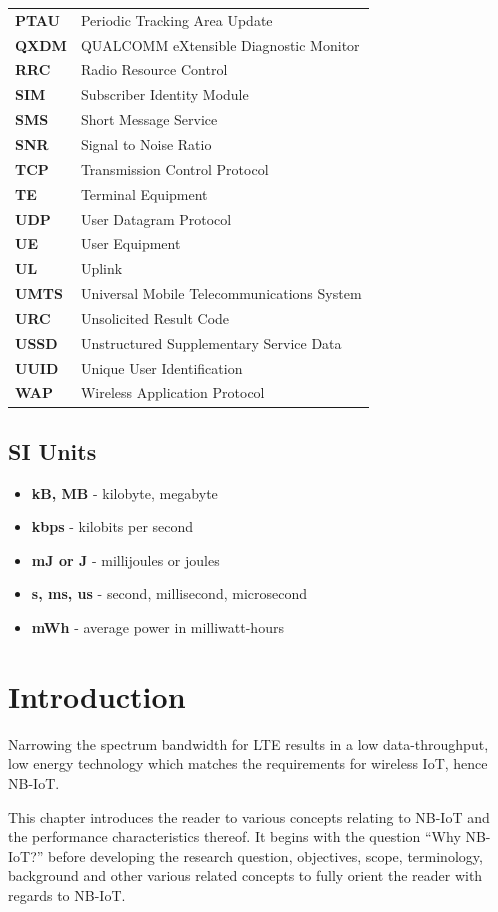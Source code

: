 \documentclass[]{article}
\makeatletter
\providecommand{\tightlist}{%
  \setlength{\itemsep}{0pt}\setlength{\parskip}{0pt}}
\newcounter{tableno}
\newenvironment{tablenos:no-prefix-table-caption}{
    \caption@ifcompatibility{}{
    \let\oldthetable\thetable
    \let\oldtheHtable\theHtable
    \renewcommand{\thetable}{tableno:\thetableno}
    \renewcommand{\theHtable}{tableno:\thetableno}
    \stepcounter{tableno}
    \captionsetup{labelformat=empty}
    }
}{
    \caption@ifcompatibility{}{
    \captionsetup{labelformat=default}
    \let\thetable\oldthetable
    \let\theHtable\oldtheHtable
    \addtocounter{table}{-1}
    }
}
\makeatother
\begin{document}
\begin{tablenos:no-prefix-table-caption}
\begin{longtable}[]{@{}ll@{}}
\textbf{PTAU} & Periodic Tracking Area Update\tabularnewline
\textbf{QXDM} & QUALCOMM eXtensible Diagnostic Monitor\tabularnewline
\textbf{RRC} & Radio Resource Control\tabularnewline
\textbf{SIM} & Subscriber Identity Module\tabularnewline
\textbf{SMS} & Short Message Service\tabularnewline
\textbf{SNR} & Signal to Noise Ratio\tabularnewline
\textbf{TCP} & Transmission Control Protocol\tabularnewline
\textbf{TE} & Terminal Equipment\tabularnewline
\textbf{UDP} & User Datagram Protocol\tabularnewline
\textbf{UE} & User Equipment\tabularnewline
\textbf{UL} & Uplink\tabularnewline
\textbf{UMTS} & Universal Mobile Telecommunications
System\tabularnewline
\textbf{URC} & Unsolicited Result Code\tabularnewline
\textbf{USSD} & Unstructured Supplementary Service Data\tabularnewline
\textbf{UUID} & Unique User Identification\tabularnewline
\textbf{WAP} & Wireless Application Protocol\tabularnewline
\bottomrule
\end{longtable}

\end{tablenos:no-prefix-table-caption}

\hypertarget{siunits}{%
\subsection*{SI Units}\label{siunits}}

\begin{itemize}
\tightlist
\item
  \textbf{kB, MB} - kilobyte, megabyte
\item
  \textbf{kbps} - kilobits per second
\item
  \textbf{mJ or J} - millijoules or joules
\item
  \textbf{s, ms, us} - second, millisecond, microsecond
\item
  \textbf{mWh} - average power in milliwatt-hours
\end{itemize}

\newpage

\hypertarget{intro}{%
\section{Introduction}\label{intro}}

Narrowing the spectrum bandwidth for LTE results in a low
data-throughput, low energy technology which matches the requirements
for wireless IoT, hence NB-IoT.

This chapter introduces the reader to various concepts relating to
NB-IoT and the performance characteristics thereof. It begins with the
question ``Why NB-IoT?'' before developing the research question,
objectives, scope, terminology, background and other various related
concepts to fully orient the reader with regards to NB-IoT.
\end{document}
